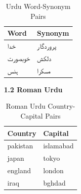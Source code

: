 \documentclass[format=acmsmall,review=true,screen=true]{acmart}
\begin{document}
        \begin{table}[]
    \begin{tabular}{|l|l|}
        \hline
                            \textbf{Word} & \textbf{Synonym}    \\
    \hline
    \texturdu{خدا}             &      \texturdu{پروردگار}\\
       \hline
    \hline
    \texturdu{خوبصورت}             &      \texturdu{دلکش}\\
       \hline
    \hline
    \texturdu{ہنس}             &      \texturdu{مسکرا}\\
       \hline

    \end{tabular}
            \caption{\label{tab:table-name}Urdu Word-Synonym Pairs}
    \end{table}

\textbf{1.2 Roman Urdu}\\

    \begin{table}[]
    \begin{tabular}{|l|l|}
        \hline
                            \textbf{Country} & \textbf{Capital}    \\
    \hline
    pakistan            &      islamabad\\
       \hline
    \hline
    japan             &      tokyo\\
       \hline
    \hline
    england             &      london\\
       \hline
    \hline
    iraq             &      bghdad\\
       \hline
    \end{tabular}
                    \caption{\label{tab:table-name}Roman Urdu Country-Capital Pairs}
    \end{table}
    
\end{document}
